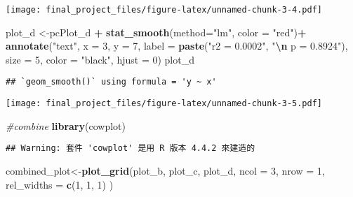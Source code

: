 \documentclass[
]{article}
\newenvironment{Shaded}{\begin{snugshade}}{\end{snugshade}}
\newcommand{\AttributeTok}[1]{\textcolor[rgb]{0.13,0.29,0.53}{#1}}
\newcommand{\CommentTok}[1]{\textcolor[rgb]{0.56,0.35,0.01}{\textit{#1}}}
\newcommand{\DecValTok}[1]{\textcolor[rgb]{0.00,0.00,0.81}{#1}}
\newcommand{\FunctionTok}[1]{\textcolor[rgb]{0.13,0.29,0.53}{\textbf{#1}}}
\newcommand{\NormalTok}[1]{#1}
\newcommand{\OtherTok}[1]{\textcolor[rgb]{0.56,0.35,0.01}{#1}}
\newcommand{\SpecialCharTok}[1]{\textcolor[rgb]{0.81,0.36,0.00}{\textbf{#1}}}
\newcommand{\StringTok}[1]{\textcolor[rgb]{0.31,0.60,0.02}{#1}}
\begin{document}
\texttt{[image: final\_project\_files/figure-latex/unnamed-chunk-3-4.pdf]}

\begin{Shaded}
\begin{Highlighting}[]
\NormalTok{plot\_d }\OtherTok{\textless{}{-}}\NormalTok{pcPlot\_d }\SpecialCharTok{+}
  \FunctionTok{stat\_smooth}\NormalTok{(}\AttributeTok{method=}\StringTok{"lm"}\NormalTok{, }\AttributeTok{color =} \StringTok{"red"}\NormalTok{)}\SpecialCharTok{+}
  \FunctionTok{annotate}\NormalTok{(}\StringTok{"text"}\NormalTok{, }
           \AttributeTok{x =} \DecValTok{3}\NormalTok{, }\AttributeTok{y =} \DecValTok{7}\NormalTok{,}
           \AttributeTok{label =} \FunctionTok{paste}\NormalTok{(}\StringTok{"r2 = 0.0002"}\NormalTok{, }\StringTok{"}\SpecialCharTok{\textbackslash{}n}\StringTok{ p = 0.8924"}\NormalTok{), }
           \AttributeTok{size =} \DecValTok{5}\NormalTok{, }\AttributeTok{color =} \StringTok{"black"}\NormalTok{, }\AttributeTok{hjust =} \DecValTok{0}\NormalTok{)}
\NormalTok{plot\_d}
\end{Highlighting}
\end{Shaded}

\begin{verbatim}
## `geom_smooth()` using formula = 'y ~ x'
\end{verbatim}

\texttt{[image: final\_project\_files/figure-latex/unnamed-chunk-3-5.pdf]}

\begin{Shaded}
\begin{Highlighting}[]
\CommentTok{\#combine}
\FunctionTok{library}\NormalTok{(cowplot)}
\end{Highlighting}
\end{Shaded}

\begin{verbatim}
## Warning: 套件 'cowplot' 是用 R 版本 4.4.2 來建造的
\end{verbatim}

\begin{Shaded}
\begin{Highlighting}[]
\NormalTok{combined\_plot}\OtherTok{\textless{}{-}}\FunctionTok{plot\_grid}\NormalTok{(plot\_b, plot\_c, plot\_d, }
          \AttributeTok{ncol =} \DecValTok{3}\NormalTok{,   }
          \AttributeTok{nrow =} \DecValTok{1}\NormalTok{,   }
          \AttributeTok{rel\_widths =} \FunctionTok{c}\NormalTok{(}\DecValTok{1}\NormalTok{, }\DecValTok{1}\NormalTok{, }\DecValTok{1}\NormalTok{)  }
\NormalTok{          )}
\end{Highlighting}
\end{Shaded}
\end{document}
